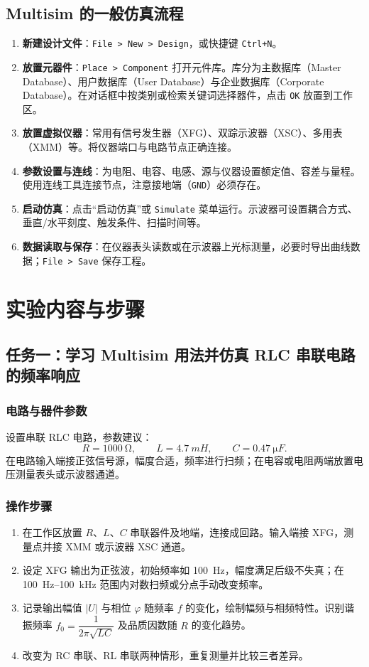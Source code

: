 \documentclass[a4paper,8pt,twocolumn]{article}
\begin{document}
\subsection{Multisim 的一般仿真流程}
\begin{enumerate}
  \item \textbf{新建设计文件}：\verb|File > New > Design|，或快捷键 \verb|Ctrl+N|。
  \item \textbf{放置元器件}：\verb|Place > Component| 打开元件库。库分为主数据库（Master Database）、用户数据库（User Database）与企业数据库（Corporate Database）。在对话框中按类别或检索关键词选择器件，点击 \texttt{OK} 放置到工作区。
  \item \textbf{放置虚拟仪器}：常用有信号发生器（XFG）、双踪示波器（XSC）、多用表（XMM）等。将仪器端口与电路节点正确连接。
  \item \textbf{参数设置与连线}：为电阻、电容、电感、源与仪器设置额定值、容差与量程。使用连线工具连接节点，注意接地端（\texttt{GND}）必须存在。
  \item \textbf{启动仿真}：点击“启动仿真”或 \verb|Simulate| 菜单运行。示波器可设置耦合方式、垂直/水平刻度、触发条件、扫描时间等。
  \item \textbf{数据读取与保存}：在仪器表头读数或在示波器上光标测量，必要时导出曲线数据；\verb|File > Save| 保存工程。
\end{enumerate}

\section{实验内容与步骤}
\subsection{任务一：学习 Multisim 用法并仿真 RLC 串联电路的频率响应}
\subsubsection*{电路与器件参数}
设置串联 RLC 电路，参数建议：
\[
R=\SI{1000}{\ohm},\qquad L=\SI{4.7}{mH},\qquad C=\SI{0.47}{\micro F}.
\]
在电路输入端接正弦信号源，幅度合适，频率进行扫频；在电容或电阻两端放置电压测量表头或示波器通道。

\subsubsection*{操作步骤}
\begin{enumerate}
  \item 在工作区放置 $R$、$L$、$C$ 串联器件及地端，连接成回路。输入端接 XFG，测量点并接 XMM 或示波器 XSC 通道。
  \item 设定 XFG 输出为正弦波，初始频率如 \SI{100}{Hz}，幅度满足后级不失真；在 \SI{100}{Hz}--\SI{100}{kHz} 范围内对数扫频或分点手动改变频率。
  \item 记录输出幅值 $|U|$ 与相位 $\varphi$ 随频率 $f$ 的变化，绘制幅频与相频特性。识别谐振频率 $f_0=\dfrac{1}{2\pi\sqrt{LC}}$ 及品质因数随 $R$ 的变化趋势。
  \item 改变为 RC 串联、RL 串联两种情形，重复测量并比较三者差异。
\end{enumerate}
\end{document}
